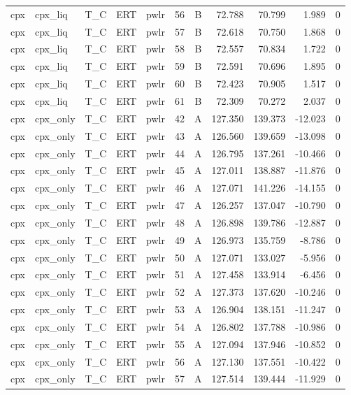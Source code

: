 \begin{longtable}{lllllrrrrrr}
cpx & cpx\_liq & T\_C & ERT & pwlr & 56 & B & 72.788 & 70.799 & 1.989 & 0 \\
cpx & cpx\_liq & T\_C & ERT & pwlr & 57 & B & 72.618 & 70.750 & 1.868 & 0 \\
cpx & cpx\_liq & T\_C & ERT & pwlr & 58 & B & 72.557 & 70.834 & 1.722 & 0 \\
cpx & cpx\_liq & T\_C & ERT & pwlr & 59 & B & 72.591 & 70.696 & 1.895 & 0 \\
cpx & cpx\_liq & T\_C & ERT & pwlr & 60 & B & 72.423 & 70.905 & 1.517 & 0 \\
cpx & cpx\_liq & T\_C & ERT & pwlr & 61 & B & 72.309 & 70.272 & 2.037 & 0 \\
cpx & cpx\_only & T\_C & ERT & pwlr & 42 & A & 127.350 & 139.373 & -12.023 & 0 \\
cpx & cpx\_only & T\_C & ERT & pwlr & 43 & A & 126.560 & 139.659 & -13.098 & 0 \\
cpx & cpx\_only & T\_C & ERT & pwlr & 44 & A & 126.795 & 137.261 & -10.466 & 0 \\
cpx & cpx\_only & T\_C & ERT & pwlr & 45 & A & 127.011 & 138.887 & -11.876 & 0 \\
cpx & cpx\_only & T\_C & ERT & pwlr & 46 & A & 127.071 & 141.226 & -14.155 & 0 \\
cpx & cpx\_only & T\_C & ERT & pwlr & 47 & A & 126.257 & 137.047 & -10.790 & 0 \\
cpx & cpx\_only & T\_C & ERT & pwlr & 48 & A & 126.898 & 139.786 & -12.887 & 0 \\
cpx & cpx\_only & T\_C & ERT & pwlr & 49 & A & 126.973 & 135.759 & -8.786 & 0 \\
cpx & cpx\_only & T\_C & ERT & pwlr & 50 & A & 127.071 & 133.027 & -5.956 & 0 \\
cpx & cpx\_only & T\_C & ERT & pwlr & 51 & A & 127.458 & 133.914 & -6.456 & 0 \\
cpx & cpx\_only & T\_C & ERT & pwlr & 52 & A & 127.373 & 137.620 & -10.246 & 0 \\
cpx & cpx\_only & T\_C & ERT & pwlr & 53 & A & 126.904 & 138.151 & -11.247 & 0 \\
cpx & cpx\_only & T\_C & ERT & pwlr & 54 & A & 126.802 & 137.788 & -10.986 & 0 \\
cpx & cpx\_only & T\_C & ERT & pwlr & 55 & A & 127.094 & 137.946 & -10.852 & 0 \\
cpx & cpx\_only & T\_C & ERT & pwlr & 56 & A & 127.130 & 137.551 & -10.422 & 0 \\
cpx & cpx\_only & T\_C & ERT & pwlr & 57 & A & 127.514 & 139.444 & -11.929 & 0 \\

\end{longtable}

